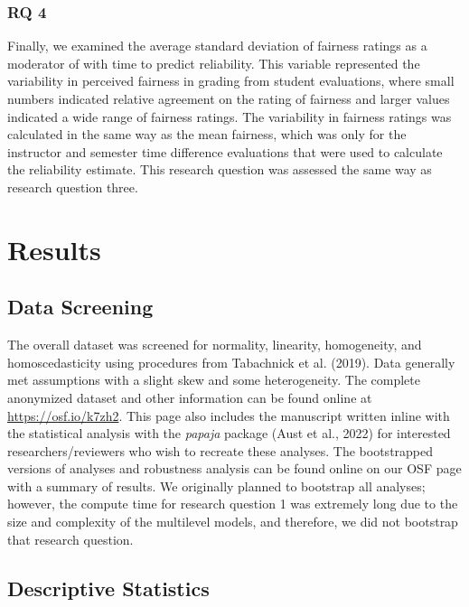 \documentclass[
  man]{apa7}
\begin{document}
\hypertarget{rq-4}{%
\subsubsection{RQ 4}\label{rq-4}}

Finally, we examined the average standard deviation of fairness ratings
as a moderator of with time to predict reliability. This variable
represented the variability in perceived fairness in grading from
student evaluations, where small numbers indicated relative agreement on
the rating of fairness and larger values indicated a wide range of
fairness ratings. The variability in fairness ratings was calculated in
the same way as the mean fairness, which was only for the instructor and
semester time difference evaluations that were used to calculate the
reliability estimate. This research question was assessed the same way
as research question three.

\hypertarget{results}{%
\section{Results}\label{results}}

\hypertarget{data-screening}{%
\subsection{Data Screening}\label{data-screening}}

The overall dataset was screened for normality, linearity, homogeneity,
and homoscedasticity using procedures from Tabachnick et al. (2019). Data
generally met assumptions with a slight skew and some heterogeneity. The
complete anonymized dataset and other information can be found online at
\url{https://osf.io/k7zh2}. This page also includes the manuscript written
inline with the statistical analysis with the \emph{papaja} package
(Aust et al., 2022) for interested researchers/reviewers who wish to recreate
these analyses. The bootstrapped versions of analyses and robustness
analysis can be found online on our OSF page with a summary of results.
We originally planned to bootstrap all analyses; however, the compute
time for research question 1 was extremely long due to the size and
complexity of the multilevel models, and therefore, we did not bootstrap
that research question.

\hypertarget{descriptive-statistics}{%
\subsection{Descriptive Statistics}\label{descriptive-statistics}}
\end{document}
